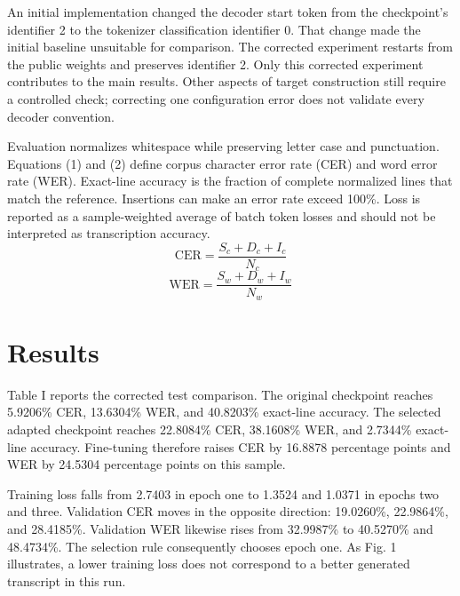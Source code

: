 \documentclass[conference]{IEEEtran}
\begin{document}
An initial implementation changed the decoder start token from the checkpoint's identifier 2 to the tokenizer classification identifier 0. That change made the initial baseline unsuitable for comparison. The corrected experiment restarts from the public weights and preserves identifier 2. Only this corrected experiment contributes to the main results. Other aspects of target construction still require a controlled check; correcting one configuration error does not validate every decoder convention.

Evaluation normalizes whitespace while preserving letter case and punctuation. Equations (1) and (2) define corpus character error rate (CER) and word error rate (WER). Exact-line accuracy is the fraction of complete normalized lines that match the reference. Insertions can make an error rate exceed 100\%. Loss is reported as a sample-weighted average of batch token losses and should not be interpreted as transcription accuracy.
\begin{equation}\mathrm{CER}=\frac{S_c+D_c+I_c}{N_c}\end{equation}\begin{equation}\mathrm{WER}=\frac{S_w+D_w+I_w}{N_w}\end{equation}
\section{Results}
Table I reports the corrected test comparison. The original checkpoint reaches 5.9206\% CER, 13.6304\% WER, and 40.8203\% exact-line accuracy. The selected adapted checkpoint reaches 22.8084\% CER, 38.1608\% WER, and 2.7344\% exact-line accuracy. Fine-tuning therefore raises CER by 16.8878 percentage points and WER by 24.5304 percentage points on this sample.

Training loss falls from 2.7403 in epoch one to 1.3524 and 1.0371 in epochs two and three. Validation CER moves in the opposite direction: 19.0260\%, 22.9864\%, and 28.4185\%. Validation WER likewise rises from 32.9987\% to 40.5270\% and 48.4734\%. The selection rule consequently chooses epoch one. As Fig. 1 illustrates, a lower training loss does not correspond to a better generated transcript in this run.
\end{document}
